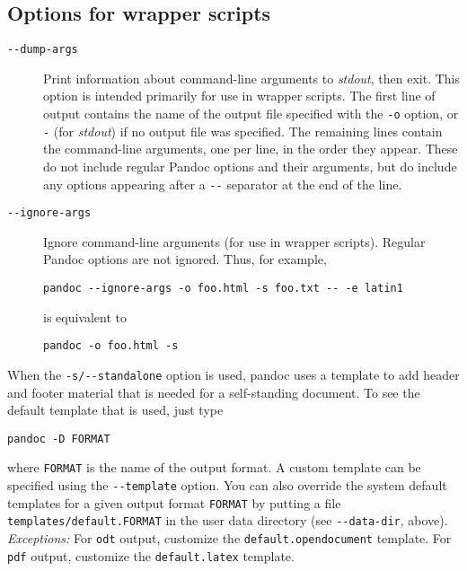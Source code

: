 \documentclass[]{article}
\begin{document}
\subsection{Options for wrapper
scripts}\label{options-for-wrapper-scripts}

\begin{description}
\item[\texttt{-{}-dump-args}]
Print information about command-line arguments to \emph{stdout}, then
exit. This option is intended primarily for use in wrapper scripts. The
first line of output contains the name of the output file specified with
the \texttt{-o} option, or \texttt{-} (for \emph{stdout}) if no output
file was specified. The remaining lines contain the command-line
arguments, one per line, in the order they appear. These do not include
regular Pandoc options and their arguments, but do include any options
appearing after a \texttt{-{}-} separator at the end of the line.
\item[\texttt{-{}-ignore-args}]
Ignore command-line arguments (for use in wrapper scripts). Regular
Pandoc options are not ignored. Thus, for example,

\begin{verbatim}
pandoc --ignore-args -o foo.html -s foo.txt -- -e latin1
\end{verbatim}

is equivalent to

\begin{verbatim}
pandoc -o foo.html -s
\end{verbatim}
\end{description}


When the \texttt{-s/-{}-standalone} option is used, pandoc uses a
template to add header and footer material that is needed for a
self-standing document. To see the default template that is used, just
type

\begin{verbatim}
pandoc -D FORMAT
\end{verbatim}

where \texttt{FORMAT} is the name of the output format. A custom
template can be specified using the \texttt{-{}-template} option. You
can also override the system default templates for a given output format
\texttt{FORMAT} by putting a file \texttt{templates/default.FORMAT} in
the user data directory (see \texttt{-{}-data-dir}, above).
\emph{Exceptions:} For \texttt{odt} output, customize the
\texttt{default.opendocument} template. For \texttt{pdf} output,
customize the \texttt{default.latex} template.
\end{document}

